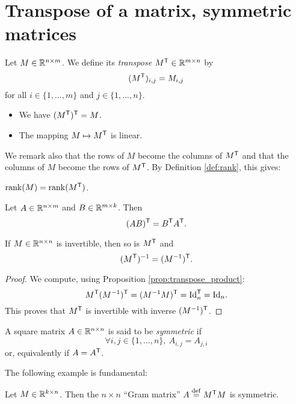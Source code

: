 \documentclass[11pt,nocut]{article}
\begin{document}
\section{Transpose of a matrix, symmetric matrices}

\begin{definition}[Transpose]
	Let $M \in \mathbb{R}^{n \times m}$. We define its \emph{transpose} $M^{{\sf T}} \in \mathbb{R}^{m \times n}$ by
	$$
	(M^{{\sf T}})_{i,j} = M_{i,j}
	$$
	for all $i \in \{1, \dots, m\}$ and $j \in \{1, \dots, n\}$.
\end{definition}

\begin{remark}
	\leavevmode
	\begin{itemize}
		\item We have $(M^{{\sf T}})^{{\sf T}} = M$. 
		\item The mapping $M \mapsto M^{{\sf T}}$ is linear.
	\end{itemize}
\end{remark}

We remark also that the rows of $M$ become the columns of $M^{{\sf T}}$ and that the columns of $M$ become the rows of $M^{{\sf T}}$. By Definition \ref{def:rank}, this gives:
\begin{proposition}
	${{\rm rank}}(M) = {{\rm rank}}(M^{{\sf T}})$.
\end{proposition}

\begin{proposition}\label{prop:transpose_product}
	Let $A \in \mathbb{R}^{n \times m}$ and $B \in \mathbb{R}^{m \times k}$. Then
	$$
	(AB)^{{\sf T}} = B^{{\sf T}} A^{{\sf T}}.
	$$
\end{proposition}

\begin{corollary}
	If $M \in \mathbb{R}^{n \times n}$ is invertible, then so is $M^{{\sf T}}$ and
	$$
	(M^{{\sf T}})^{-1} = (M^{-1})^{{\sf T}}.
	$$
\end{corollary}
\begin{proof}
	We compute, using Proposition \ref{prop:transpose_product}:
	$$
	M^{{\sf T}} (M^{-1})^{{\sf T}} = (M^{-1} M)^{{\sf T}} = {{\rm Id}}_n^{{\sf T}} = {{\rm Id}}_n.
	$$
	This proves that $M^{{\sf T}}$ is invertible with inverse $(M^{-1})^{{\sf T}}$.
\end{proof}


\begin{definition}
	A square matrix $A \in \mathbb{R}^{n \times n}$ is said to be \emph{symmetric} if
	$$
	\forall i,j \in \{1, \dots, n\}, \ A_{i,j} = A_{j,i}
	$$
	or, equivalently if $A = A^{{\sf T}}$.
\end{definition}

The following example is fundamental:
\begin{example}
	Let $M \in \mathbb{R}^{k \times n}$. Then the $n\times n$ ``Gram matrix'' $A \overset{\rm def}{=} M^{{\sf T}} M$ is symmetric.
\end{example}

	\vspace{1cm}
	\centerline{}

%
%
\end{document}
